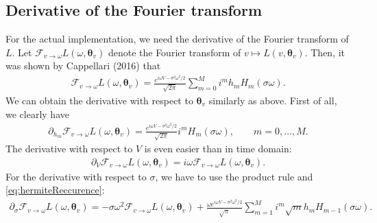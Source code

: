 \documentclass{article}
\numberwithin{equation}{section}
\theoremstyle{nonumberplain}
\newcommand{\tv}{\bm \theta_v}
\newcommand{\ft}[2]{\mathcal F_{#1\to#2}}
\newcommand{\ftvw}{\ft{v}{\omega}}
\begin{document}
\subsection{Derivative of the Fourier transform}

For the actual implementation, we need the derivative of the Fourier transform of $L$. Let $\ftvw L(\omega,\tv)$ denote the Fourier transform of $v \mapsto L(v,\tv)$. Then, it was shown by Cappellari (2016) that
\begin{align*}
\ftvw L(\omega, \tv) = \frac{e^{i\omega V -\sigma^2 \omega^2/2}}{\sqrt{2\pi}}\sum_{m=0}^M i^m h_m H_m(\sigma \omega).
\end{align*}
We can obtain the derivative with respect to $\tv$ similarly as above. First of all, we clearly have
\begin{align*}
\partial_{h_m} \ftvw L(\omega,\tv) = \frac{e^{i\omega V -\sigma^2 \omega^2/2}}{\sqrt{2\pi}} i^m H_m(\sigma \omega), \qquad m = 0,\ldots,M.
\end{align*}
The derivative with respect to $V$ is even easier than in time domain:
\begin{align*}
\partial_V \ftvw L(\omega, \tv) = i \omega \ftvw L(\omega, \tv).
\end{align*}
For the derivative with respect to $\sigma$, we have to use the product rule and \eqref{eq:hermiteReccurence}:
\begin{align*}
\partial_\sigma \ftvw L(\omega, \tv) = - \sigma \omega^2 \ftvw L(\omega, \tv) + \frac{\omega e^{i\omega V -\sigma^2 \omega^2/2}}{\sqrt{\pi}} \sum_{m=1}^M i^m \sqrt m h_m H_{m-1}(\sigma \omega).
\end{align*}


\printbibliography
\end{document}
